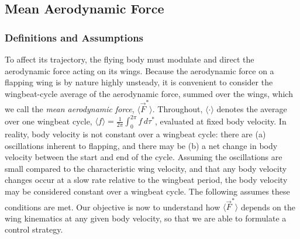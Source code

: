 \documentclass[11pt,letterpaper]{article}
\begin{document}
\subsection{Mean Aerodynamic Force}\label{sec:maf}

\subsubsection{Definitions and Assumptions}

To affect its trajectory, the flying body
must modulate and direct the aerodynamic force
acting on its wings. Because the aerodynamic force
on a flapping wing is by nature highly unsteady,
it is convenient to consider the wingbeat-cycle average
of the aerodynamic force, summed over the wings,
which we call the \emph{mean aerodynamic force}, $\langle \vec{F}^* \rangle$.
Throughout, $\langle \cdot \rangle$ denotes the average over one
wingbeat cycle,
$\langle f \rangle = \frac{1}{2\pi} \int_0^{2\pi} f \, d\tau^*$,
evaluated at fixed body velocity.
In reality, body velocity is not constant over a wingbeat cycle: there
are (a) oscillations inherent to flapping, and there may be
(b) a net change in body velocity between the start and end of the cycle.
Assuming the oscillations are small compared to the characteristic
wing velocity, and that any body velocity changes
occur at a slow rate relative to the wingbeat period, the body
velocity may be considered constant over a wingbeat cycle.
The following assumes these conditions are met.
Our objective is now to understand how $\langle \vec{F}^* \rangle$
depends on the wing kinematics at any given body velocity,
so that we are able to formulate a control strategy.
\end{document}
